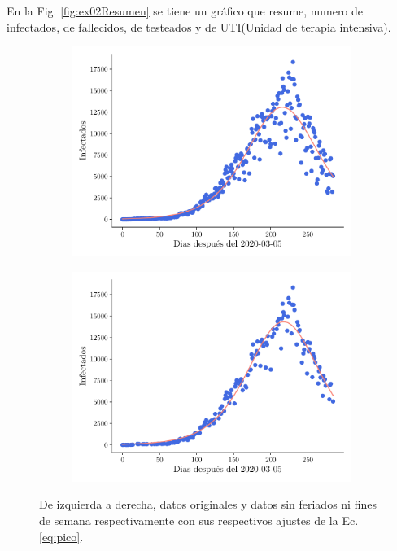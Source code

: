 \documentclass[twocolumn,aps,prl]{revtex4-1}
\begin{document}
En la Fig. \ref{fig:ex02Resumen} se tiene un gráfico que resume, numero de infectados, de fallecidos, de testeados y de UTI(Unidad de terapia intensiva).

\begin{figure}[ht!]
  \centering
  \begin{subfigure}[b]{0.49\linewidth}
      \centering
      \includegraphics[width = 1.05\textwidth]{figuras/ex02-fit.pdf}
      \caption{}
      \label{fig:ex02-fit}
  \end{subfigure}\quad
  \begin{subfigure}[b]{0.49\linewidth}
      \centering
      \includegraphics[width = 1.05\textwidth]{figuras/ex02-fit-sin-Finde.pdf}
      \caption{}
      \label{fig:ex02-fit-sin-Finde}
  \end{subfigure}
  \caption{De izquierda a derecha, datos originales y datos sin feriados ni fines de semana respectivamente con sus respectivos ajustes de la Ec. \ref{eq:pico}.}
  \label{fig:ex02-fit-ambas}
\end{figure}
\end{document}
